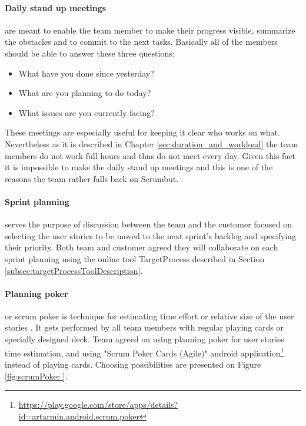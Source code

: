 \paragraph{Daily stand up meetings} are meant to enable the team member to make their progress visible, summarize the obstacles and to commit to the next tasks. Basically all of the members should be able to answer these three questions:

\begin{itemize}
\item What have you done since yesterday?
\item What are you planning to do today?
\item What issues are you currently facing?
\end{itemize}

These meetings are especially useful for keeping it clear who works on what. Nevertheless as it is described in Chapter \ref{sec:duration_and_workload} the team members do not work full hours and thus do not meet every day. Given this fact it is impossible to make the daily stand up meetings and this is one of the reasons the team rather falls back on Scrumbut.

\paragraph{Sprint planning} serves the purpose of discussion between the team and the customer focused on selecting the user stories to be moved to the next sprint's backlog and specifying their priority. Both team and customer agreed they will collaborate on each sprint planning using the online tool TargetProcess described in Section \ref{subsec:targetProcessToolDescription}.

\paragraph{Planning poker} or scrum poker is technique for estimating time effort or relative size of the user stories \cite{cohn2005agile}. It gets performed by all team members with regular playing cards or specially designed deck. Team agreed on using planning poker for user stories time estimation, and using "Scrum Poker Cards (Agile)" android application\footnote{\url{https://play.google.com/store/apps/details?id=artarmin.android.scrum.poker}} instead of playing cards. Choosing possibilities are presented on Figure \ref{fig:scrumPoker }.

